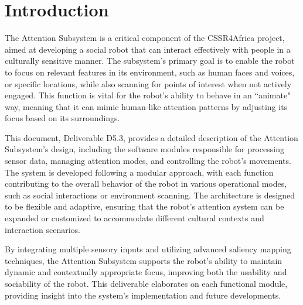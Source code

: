 \documentclass{CSSRforAfrica}
\begin{document}
\pagebreak
\tableofcontents
\pagebreak
 
\section{Introduction}
The Attention Subsystem is a critical component of the CSSR4Africa project, aimed at developing a social robot that can interact effectively with people in a culturally sensitive manner. The subsystem’s primary goal is to enable the robot to focus on relevant features in its environment, such as human faces and voices, or specific locations, while also scanning for points of interest when not actively engaged. This function is vital for the robot’s ability to behave in an ``animate" way, meaning that it can mimic human-like attention patterns by adjusting its focus based on its surroundings.

This document, Deliverable D5.3, provides a detailed description of the Attention Subsystem’s design, including the software modules responsible for processing sensor data, managing attention modes, and controlling the robot's movements. The system is developed following a modular approach, with each function contributing to the overall behavior of the robot in various operational modes, such as social interactions or environment scanning. The architecture is designed to be flexible and adaptive, ensuring that the robot's attention system can be expanded or customized to accommodate different cultural contexts and interaction scenarios.

By integrating multiple sensory inputs and utilizing advanced saliency mapping techniques, the Attention Subsystem supports the robot's ability to maintain dynamic and contextually appropriate focus, improving both the usability and sociability of the robot. This deliverable elaborates on each functional module, providing insight into the system's implementation and future developments.

 
\end{document}
